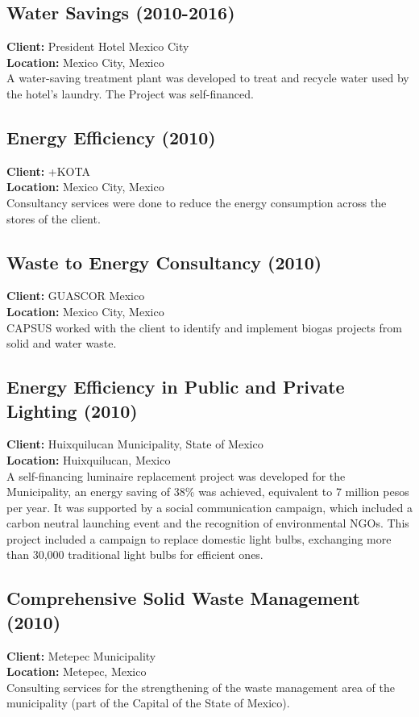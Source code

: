 \documentclass[
	a4paper,
	12pt,
	unnumberedsections,
]{CSSullivanBusinessReport}
\begin{document}
\subsection{Water Savings (2010-2016)}
\textbf{Client:}  President Hotel Mexico City \\
\textbf{Location:}  Mexico City, Mexico \\[0.5em]
 A water-saving treatment plant was developed to treat and recycle water used by the hotel’s laundry. The Project was self-financed.

\subsection{Energy Efficiency (2010)}
\textbf{Client:}  +KOTA \\
\textbf{Location:}  Mexico City, Mexico \\[0.5em]
 Consultancy services were done to reduce the energy consumption across the stores of the client.

\subsection{Waste to Energy Consultancy (2010)}
\textbf{Client:}  GUASCOR Mexico \\
\textbf{Location:}  Mexico City, Mexico \\[0.5em]
 CAPSUS worked with the client to identify and implement biogas projects from solid and water waste.

\subsection{Energy Efficiency in Public and Private Lighting (2010)}
\textbf{Client:}  Huixquilucan Municipality, State of Mexico \\
\textbf{Location:}  Huixquilucan, Mexico \\[0.5em]
 A self-financing luminaire replacement project was developed for the Municipality, an energy saving of 38\% was achieved, equivalent to 7 million pesos per year. It was supported by a social communication campaign, which included a carbon neutral launching event and the recognition of environmental NGOs. This project included a campaign to replace domestic light bulbs, exchanging more than 30,000 traditional light bulbs for efficient ones.

\subsection{Comprehensive Solid Waste Management (2010)}
\textbf{Client:}  Metepec Municipality \\
\textbf{Location:}  Metepec, Mexico \\[0.5em]
 Consulting services for the strengthening of the waste management area of the municipality (part of the Capital of the State of Mexico).
\end{document}
